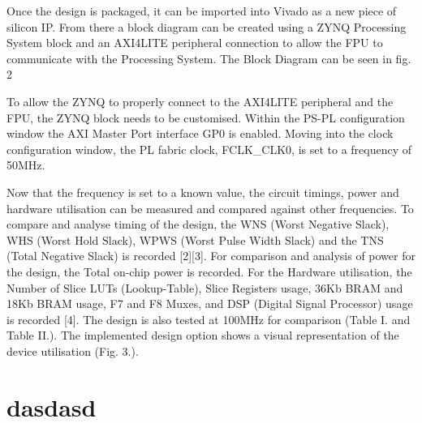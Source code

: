 \documentclass[conference]{IEEEtran}
\begin{document}
Once the design is packaged, it can be imported into Vivado as a new piece of silicon IP. From there a block diagram can be created using a ZYNQ Processing System block and an AXI4LITE peripheral connection to allow the FPU to communicate with the Processing System. The Block Diagram can be seen in fig. 2
\newline

To allow the ZYNQ to properly connect to the AXI4LITE peripheral and the FPU, the ZYNQ block needs to be customised. Within the PS-PL configuration window the AXI Master Port interface GP0 is enabled. Moving into the clock configuration window, the PL fabric clock, FCLK\_CLK0, is set to a frequency of 50MHz. 
\newline

Now that the frequency is set to a known value, the circuit timings, power and hardware utilisation can be measured and compared against other frequencies. To compare and analyse timing of the design, the WNS (Worst Negative Slack), WHS (Worst Hold Slack), WPWS (Worst Pulse Width Slack) and the TNS (Total Negative Slack) is recorded [2][3]. For comparison and analysis of power for the design, the Total on-chip power is recorded. For the Hardware utilisation, the Number of Slice LUTs (Lookup-Table), Slice Registers usage, 36Kb BRAM and 18Kb BRAM usage, F7 and F8 Muxes, and DSP (Digital Signal Processor) usage is recorded [4]. The design is also tested at 100MHz for comparison (Table I. and Table II.). The implemented design option shows a visual representation of the device utilisation (Fig. 3.). 


\section{dasdasd}
\end{document}
